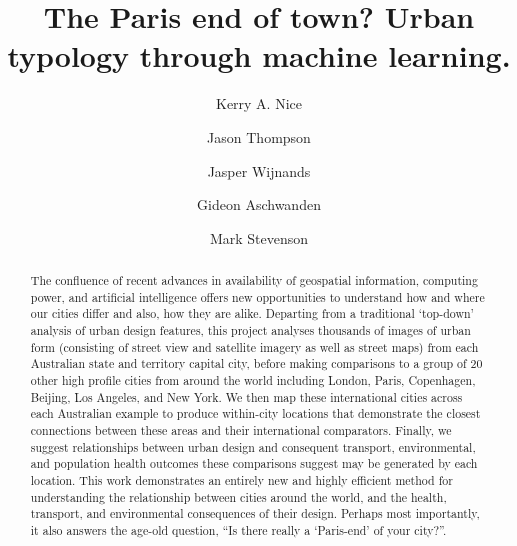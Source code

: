 \documentclass[final,3p,times,authoryear]{elsarticle}
\begin{document}
\begin{frontmatter}



\title{The Paris end of town? Urban typology through machine learning.} 




\author[melb,monash]{Kerry A. Nice}

\author[melb]{Jason Thompson} 
\author[melb]{Jasper Wijnands} 
\author[melb]{Gideon Aschwanden} 
\author[melb]{Mark Stevenson} 

\address[melb]{Transport, Health, and Urban Design Hub, Faculty of Architecture, Building, and Planning, University of Melbourne, Victoria 3010, Australia}
\address[monash]{School of Earth, Atmosphere and Environment, Monash University, Clayton, Australia}
\begin{abstract}

The confluence of recent advances in availability of geospatial information, computing power, and artificial intelligence offers new opportunities to understand how and where our cities differ and also, how they are alike. Departing from a traditional `top-down' analysis of urban design features, this project analyses thousands of images of urban form (consisting of street view and satellite imagery as well as street maps) from each Australian state and territory capital city, before making comparisons to a group of 20 other high profile cities from around the world including London, Paris, Copenhagen, Beijing, Los Angeles, and New York. We then map these international cities across each Australian example to produce within-city locations that demonstrate the closest connections between these areas and their international comparators. Finally, we suggest relationships between urban design and consequent transport, environmental, and population health outcomes these comparisons suggest may be generated by each location. This work demonstrates an entirely new and highly efficient method for understanding the relationship between cities around the world, and the health, transport, and environmental consequences of their design. Perhaps most importantly, it also answers the age-old question, ``Is there really a `Paris-end' of your city?''.




\end{abstract}
\end{frontmatter}
\end{document}
